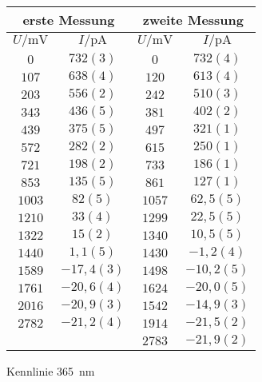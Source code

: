 \begin{figure}[htbp]
   \centering
\caption{Kennlinie \SI{365}{nm}}
\begin{tabular}{cc||cc}
\hline\multicolumn{2}{c||}{erste Messung} & \multicolumn{2}{c}{zweite Messung}\\

\hline
$U / \unit{\milli\volt}$ & $I / \unit{\pico\ampere}$ & $U / \unit{\milli\volt}$ & $I / \unit{\pico\ampere}$ \\ 
\hline
$0$ & $732(3)$ & $0$ & $732(4)$ \\
$107$ & $638(4)$ & $120$ & $613(4)$ \\
$203$ & $556(2)$ & $242$ & $510(3)$ \\
$343$ & $436(5)$ & $381$ & $402(2)$ \\
$439$ & $375(5)$ & $497$ & $321(1)$ \\
$572$ & $282(2)$ & $615$ & $250(1)$ \\
$721$ & $198(2)$ & $733$ & $186(1)$ \\
$853$ & $135(5)$ & $861$ & $127(1)$ \\
$1003$ & $82(5)$ & $1057$ & $62,5(5)$ \\
$1210$ & $33(4)$ & $1299$ & $22,5(5)$ \\
$1322$ & $15(2)$ & $1340$ & $10,5(5)$ \\
$1440$ & $1,1(5)$ & $1430$ & $-1,2(4)$ \\
$1589$ & $-17,4(3)$ & $1498$ & $-10,2(5)$ \\
$1761$ & $-20,6(4)$ & $1624$ & $-20,0(5)$ \\
$2016$ & $-20,9(3)$ & $1542$ & $-14,9(3)$ \\
$2782$ & $-21,2(4)$ & $1914$ & $-21,5(2)$ \\
   &    & $2783$ & $-21,9(2)$ \\
\hline\end{tabular}
\label{kennlinie_365nm}
\end{figure}